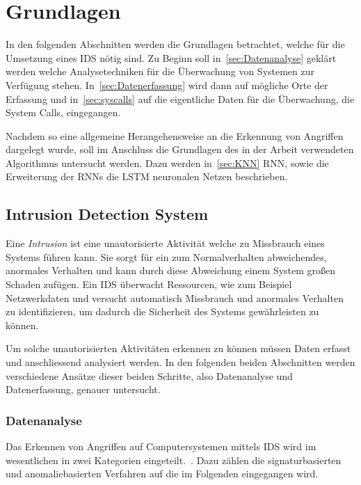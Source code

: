 \chapter{Grundlagen}\label{ch:Grundlagen}
    In den folgenden Abschnitten werden die Grundlagen betrachtet, welche für die Umsetzung eines \ac{IDS} nötig sind.
    Zu Beginn soll in~\autoref{sec:Datenanalyse} geklärt werden welche Analysetechniken für die Überwachung von Systemen zur Verfügung stehen.
    In~\autoref{sec:Datenerfassung} wird dann auf mögliche Orte der Erfassung und in~\autoref{sec:syscalls} auf die eigentliche Daten für die Überwachung, die System Calls, eingegangen.

    Nachdem so eine allgemeine Herangehensweise an die Erkennung von Angriffen dargelegt wurde, 
    soll im Anschluss die Grundlagen des in der Arbeit verwendeten Algorithmus untersucht werden.
    Dazu werden in~\autoref{sec:KNN} \ac{RNN}, sowie die Erweiterung der \ac{RNN}s die \ac{LSTM} neuronalen Netzen beschrieben.

    \section{Intrusion Detection System}\label{sec:IDS}
        Eine \textit{Intrusion}  ist eine unautorisierte Aktivität welche zu Missbrauch eines Systems führen kann.
        Sie sorgt für ein zum Normalverhalten abweichendes, anormales Verhalten und kann durch diese Abweichung einem System großen Schaden zufügen.
        Ein \ac{IDS} überwacht Ressourcen, wie zum Beispiel Netzwerkdaten und versucht automatisch Missbrauch und anormales Verhalten zu identifizieren, um dadurch die Sicherheit des Systems gewährleisten zu können.~\cite{IDSPIETRO2008}

        Um solche unautorisierten Aktivitäten erkennen zu können müssen Daten erfasst und anschliessend analysiert werden.
        In den folgenden beiden Abschnitten werden verschiedene Ansätze dieser beiden Schritte, also Datenanalyse und Datenerfassung, genauer untersucht.

        \subsection{Datenanalyse}\label{sec:Datenanalyse}
            Das Erkennen von Angriffen auf Computersystemen mittels \ac{IDS} wird im wesentlichen in zwei Kategorien eingeteilt.~\cite{IDSreview, IDSsurvey, IDSsurvey2}.
            Dazu zählen die signaturbasierten und anomaliebasierten Verfahren auf die im Folgenden eingegangen wird.

